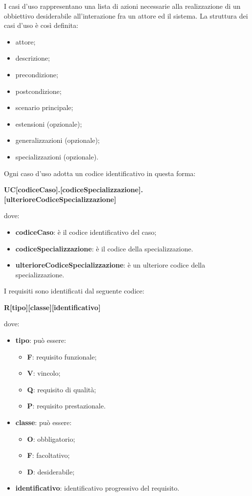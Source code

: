 		
		I casi d'uso rappresentano una lista di azioni necessarie alla realizzazione di un obbiettivo desiderabile all'interazione fra un attore ed il sistema.
		La struttura dei casi d'uso è così definita:
		\begin{itemize}
		    \item attore;
		    \item descrizione;
		    \item precondizione;
		    \item postcondizione;
		    \item scenario principale;
		    \item estensioni (opzionale);
		    \item generalizzazioni (opzionale);
		    \item specializzazioni (opzionale).
		\end{itemize}
		Ogni caso d'uso adotta un codice identificativo in questa forma:\\
	    \centerline{\textbf{UC[codiceCaso].[codiceSpecializzazione].[ulterioreCodiceSpecializzazione]}}
        dove:
	    \begin{itemize}
	        \item \textbf{codiceCaso}: è il codice identificativo del caso;
	        \item \textbf{codiceSpecializzazione}: è il codice della specializzazione.
	        \item \textbf{ulterioreCodiceSpecializzazione}: è un ulteriore codice della specializzazione.
	    \end{itemize}
	    I requisiti sono identificati dal seguente codice:\\
	    \centerline{\textbf{R[tipo][classe][identificativo]}}
	    dove:
	    \begin{itemize}
	        \item \textbf{tipo}: può essere:
	        \begin{itemize}
	            \item \textbf{F}: requisito funzionale;
	            \item \textbf{V}: vincolo;
	            \item \textbf{Q}: requisito di qualità;
	            \item \textbf{P}: requisito prestazionale. 
	        \end{itemize}
	        \item \textbf{classe}: può essere:
	        \begin{itemize}
	            \item \textbf{O}: obbligatorio;
	            \item \textbf{F}: facoltativo;
	            \item \textbf{D}: desiderabile;
	        \end{itemize}
	        \item \textbf{identificativo}: identificativo progressivo del requisito.
	    \end{itemize}
